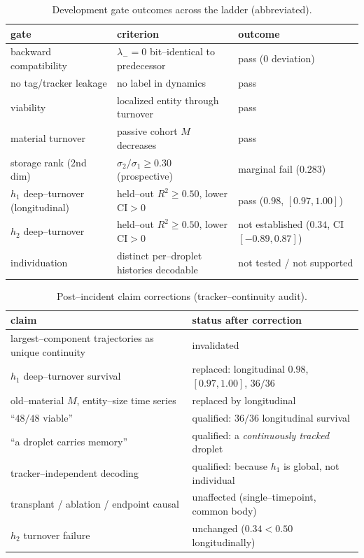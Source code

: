 \documentclass[11pt]{article}
\begin{document}
\begin{table}[t]\centering\small
\caption{Development gate outcomes across the ladder (abbreviated).}
\label{tab:gates}
\begin{tabular}{@{}p{3.2cm}p{5.6cm}p{4.6cm}@{}}\toprule gate & criterion & outcome\\\midrule
backward compatibility & $\lambda_-{=}0$ bit--identical to predecessor & pass ($0$ deviation)\\
no tag/tracker leakage & no label in dynamics & pass\\
viability & localized entity through turnover & pass\\
material turnover & passive cohort $M$ decreases & pass\\
storage rank (2nd dim) & $\sigma_2/\sigma_1 \ge 0.30$ (prospective) & marginal fail ($0.283$)\\
$h_1$ deep--turnover (longitudinal) & held--out $R^2\ge0.50$, lower CI${>}0$ & pass ($0.98$, $[0.97,1.00]$)\\
$h_2$ deep--turnover & held--out $R^2\ge0.50$, lower CI${>}0$ & not established ($0.34$, CI $[-0.89,0.87]$)\\
individuation & distinct per--droplet histories decodable & not tested / not supported\\\bottomrule
\end{tabular}
\end{table}
\begin{table}[t]\centering\small
\caption{Post--incident claim corrections (tracker--continuity audit).}
\label{tab:corrections}
\begin{tabular}{@{}ll@{}}\toprule
claim & status after correction\\\midrule
largest--component trajectories as unique continuity & invalidated\\
$h_1$ deep--turnover survival & replaced: longitudinal $0.98$, $[0.97,1.00]$, $36/36$\\
old--material $M$, entity--size time series & replaced by longitudinal\\
``$48/48$ viable'' & qualified: $36/36$ longitudinal survival\\
``a droplet carries memory'' & qualified: a \emph{continuously tracked} droplet\\
tracker--independent decoding & qualified: because $h_1$ is global, not individual\\
transplant / ablation / endpoint causal & unaffected (single--timepoint, common body)\\
$h_2$ turnover failure & unchanged ($0.34<0.50$ longitudinally)\\\bottomrule
\end{tabular}
\end{table}
\end{document}
